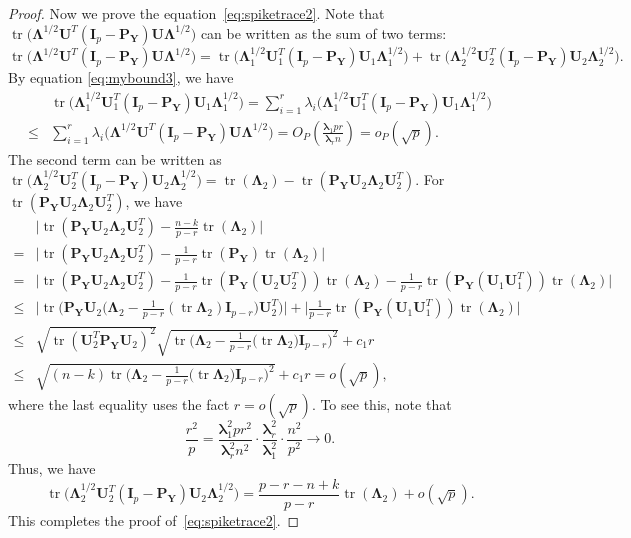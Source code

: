 \documentclass[12pt]{article} %
\DeclareMathOperator{\mytr}{tr}
\newcommand{\bP}{\mathbf{P}}
\newcommand{\bY}{\mathbf{Y}}
\newcommand{\bI}{\mathbf{I}}
\newcommand{\bU}{\mathbf{U}}
\newcommand{\bfsym}[1]{\ensuremath{\boldsymbol{#1}}}
\def\blambda {\bfsym {\lambda}}
\def\bLambda {\bfsym {\Lambda}}
\theoremstyle{definition}
\begin{document}
\begin{appendices}
\begin{proof}
    Now we prove the equation~\eqref{eq:spiketrace2}. Note that
$
\mytr\big(\bLambda^{1/2} \bU^T (\bI_p-\bP_{\bY})\bU \bLambda^{1/2}\big)
    $ can be written as the sum of two terms:
    $$
\mytr\big(\bLambda^{1/2} \bU^T (\bI_p-\bP_{\bY})\bU \bLambda^{1/2}\big)
=
\mytr\big(\bLambda_1^{1/2} \bU_1^T (\bI_p-\bP_{\bY})\bU_1 \bLambda_1^{1/2}\big)
+
\mytr\big(\bLambda_2^{1/2} \bU_2^T (\bI_p-\bP_{\bY})\bU_2 \bLambda_2^{1/2}\big).
    $$
    By equation \ref{eq:mybound3}, we have 
    $$
    \begin{aligned}
        &\mytr\big(\bLambda_1^{1/2} \bU_1^T (\bI_p-\bP_{\bY})\bU_1 \bLambda_1^{1/2}\big)=
    \sum_{i=1}^r \lambda_i\big(\bLambda_1^{1/2} \bU_1^T (\bI_p-\bP_{\bY})\bU_1 \bLambda_1^{1/2}\big)\\
        \leq&
    \sum_{i=1}^r \lambda_i\big(\bLambda^{1/2} \bU^T (\bI_p-\bP_{\bY})\bU \bLambda^{1/2}\big)
    =O_P(\frac{\blambda_1 p r}{\blambda_r n})=o_P(\sqrt{p}).
    \end{aligned}    
    $$
    The second term can be written as
    $
    \mytr\big(\bLambda_2^{1/2} \bU_2^T (\bI_p-\bP_{\bY})\bU_2 \bLambda_2^{1/2}\big)
    =
    \mytr(\bLambda_2)-\mytr(\bP_{\bY}\bU_2\bLambda_2 \bU_2^T)
    $.
    For $\mytr(\bP_{\bY}\bU_2\bLambda_2 \bU_2^T)$, we have
    $$
    \begin{aligned}
        &
        \big|
    \mytr(\bP_{\bY}\bU_2\bLambda_2 \bU_2^T)
    -\frac{n-k}{p-r}\mytr(\bLambda_2)
    \big|\\
        =&
        \big|
    \mytr(\bP_{\bY}\bU_2\bLambda_2 \bU_2^T)
        -\frac{1}{p-r}\mytr(\bP_{\bY})\mytr(\bLambda_2)
    \big|\\
        =&
        \big|
    \mytr(\bP_{\bY}\bU_2\bLambda_2 \bU_2^T)
        -\frac{1}{p-r}\mytr(\bP_{\bY}(\bU_2\bU_2^T))\mytr(\bLambda_2)
        -\frac{1}{p-r}\mytr(\bP_{\bY}(\bU_1\bU_1^T))\mytr(\bLambda_2)
    \big|\\
        \leq&
    \Big|
        \mytr\Big(\bP_{\bY} \bU_2 \big(\bLambda_2-\frac{1}{p-r} (\mytr \bLambda_2) \bI_{p-r} \big) \bU_2^T\Big)
    \Big|
        +
        \Big|\frac{1}{p-r}\mytr(\bP_{\bY}(\bU_1\bU_1^T))\mytr(\bLambda_2)\Big|
        \\
        \leq &
        \sqrt{\mytr(\bU_2^T\bP_{\bY}\bU_2)^2}
        \sqrt{\mytr \Big(\bLambda_2-\frac{1}{p-r}\big(\mytr \bLambda_2\big) \bI_{p-r}\Big)^2}+c_1 r
        \\
        \leq&\sqrt{(n-k)\mytr \Big(\bLambda_2-\frac{1}{p-r}\big(\mytr \bLambda_2\big) \bI_{p-r}\Big)^2}+c_1 r
        =o(\sqrt{p}),
    \end{aligned}
    $$
    where the last equality uses the fact $r=o(\sqrt{p})$. To see this, note that
    $$
   \frac{r^2}{p} = \frac{\blambda_1^2 p r^2}{\blambda_r^2 n^2}\cdot\frac{\blambda_r^2}{\blambda_1^2}\cdot\frac{n^2}{p^2}\to 0.
    $$
    Thus, we have
    $$
    \mytr\big(\bLambda_2^{1/2} \bU_2^T (\bI_p-\bP_{\bY})\bU_2 \bLambda_2^{1/2}\big)
    =
    \frac{p-r-n+k}{p-r}\mytr(\bLambda_2)+o(\sqrt{p}).
    $$
    This completes the proof of~\eqref{eq:spiketrace2}.
\end{proof}


\end{appendices}
\end{document}
